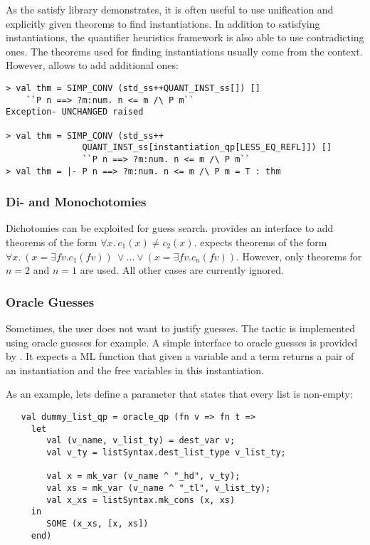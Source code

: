 As the satisfy library demonstrates, it is often 
useful to use unification and explicitly given theorems to 
find instantiations. In addition to satisfying instantiations, the quantifier heuristics framework
is also able to use contradicting ones. The theorems used for finding instantiations usually come from
the context. However,  allows to add additional ones:

\begin{session}
\begin{verbatim}
> val thm = SIMP_CONV (std_ss++QUANT_INST_ss[]) [] 
    ``P n ==> ?m:num. n <= m /\ P m``
Exception- UNCHANGED raised

> val thm = SIMP_CONV (std_ss++
               QUANT_INST_ss[instantiation_qp[LESS_EQ_REFL]]) [] 
               ``P n ==> ?m:num. n <= m /\ P m``
> val thm = |- P n ==> ?m:num. n <= m /\ P m = T : thm
\end{verbatim}
\end{session}

\subsubsection{Di- and Monochotomies}

Dichotomies can be exploited for guess search.
 provides an interface to add theorems
of the form $\forall x.\ c_1(x) \neq c_2(x)$. 
 expects theorems of the form
$\forall x. \ (x = \exists \textit{fv}. c_1(\textit{fv}))\ \vee \ldots \vee (x = \exists \textit{fv}. c_n(\textit{fv}))$. 
However, only theorems for $n = 2$ and $n = 1$ are used. All other cases are currently ignored.

\subsubsection{Oracle Guesses}

Sometimes, the user does not want to justify guesses. The tactic
 is implemented using oracle guesses for example. 
A simple interface to oracle guesses is provided by .
It expects a ML function that given a variable and a term returns
a pair of an instantiation and the free variables in this instantiation.

As an example, lets define a parameter that states that every list is non-empty:
\begin{verbatim}
   val dummy_list_qp = oracle_qp (fn v => fn t =>
     let
        val (v_name, v_list_ty) = dest_var v;
        val v_ty = listSyntax.dest_list_type v_list_ty;

        val x = mk_var (v_name ^ "_hd", v_ty);
        val xs = mk_var (v_name ^ "_tl", v_list_ty);
        val x_xs = listSyntax.mk_cons (x, xs)
     in
        SOME (x_xs, [x, xs])
     end)
\end{verbatim}


